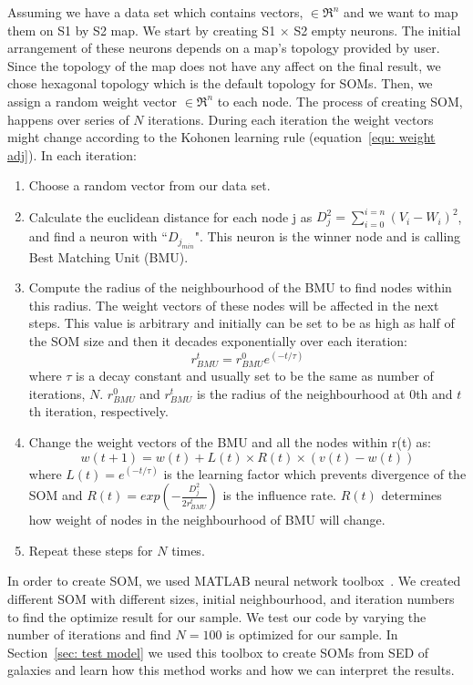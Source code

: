      Assuming we have a data set which contains vectors,  $\in \Re^n$ and we want to map them on S1 by S2 map. 
     We start by creating S1 $\times$ S2 empty neurons. 
     The initial arrangement of these neurons depends on a map's topology provided by user.
     Since the topology of the map does not have any affect on the final result, we chose hexagonal topology which is the default topology for SOMs.
     Then, we assign a random weight vector  $\in \Re^n$ to each node.
     The process of creating SOM, happens over series of $N$ iterations. 
     During each iteration the weight vectors might change according to the Kohonen learning rule (equation~\ref{equ: weight adj}). 
      In each iteration:
     \begin{enumerate}
     \item Choose a random vector from our data set.
     \item Calculate the euclidean distance for each node j as  $D_j^2= \sum_{i=0}^{i=n} (V_i - W_i)^2$, and find a neuron with ``$D_{j_{min}}$". This neuron is the winner node and is calling Best Matching Unit (BMU). 
     \item  Compute the radius of the neighbourhood of the BMU to find nodes within this radius. The weight vectors of these nodes will be affected in the next steps. This value is arbitrary and initially can be set to be as high as half of the SOM size and then it decades exponentially over each iteration:
   \begin{equation}
   r^t_{BMU} = r^0_{BMU}e^{(-t/\tau)}
   \end{equation}
   where $\tau$ is a decay constant and usually set to be the same as number of iterations, $N$. $r^0_{BMU}$ and $r^t_{BMU}$ is the radius of the neighbourhood at 0th and $t$th iteration, respectively. 
   \item Change the weight vectors of the BMU and all the nodes within r(t) as:
   \begin{equation}
   \label{equ: weight adj}
   w(t+1)=w(t)+L(t) \times R(t) \times(v(t)-w(t))
   \end{equation}
   where $L(t) = e^{(-t/\tau)}$ is the learning factor which prevents divergence of the SOM and $R(t)=exp(-\frac{D_j^2}{2r^t_{BMU}})$ is the influence rate. $R(t)$ determines how weight of nodes in the neighbourhood of BMU will change.
   \item  Repeat these steps for $N$ times.
    \end{enumerate}
   
    In order to create SOM, we used {\tiny MATLAB} neural network toolbox~\citep{sommatlab}. 
    We created different SOM with different sizes, initial neighbourhood, and iteration numbers to find the optimize result for our sample.
    We test our code by varying the number of iterations and find $N = 100$ is optimized for our sample.
    In Section~\ref{sec: test model} we used this toolbox to create SOMs from SED of galaxies and learn how this method works and how we can interpret the results.
   
